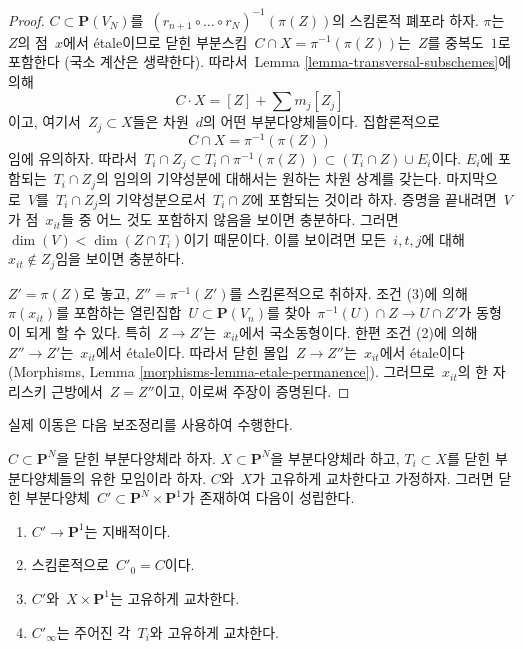 \begin{proof}
\medskip\noindent
$C \subset \mathbf{P}(V_N)$를\ 
$(r_{n + 1} \circ \ldots \circ r_N)^{-1}(\pi(Z))$의 스킴론적 폐포라
하자. $\pi$는\  $Z$의 점\  $x$에서 \'etale이므로 닫힌 부분스킴\ 
$C \cap X = \pi^{-1}(\pi(Z))$는\  $Z$를 중복도\  $1$로 포함한다
(국소 계산은 생략한다). 따라서\  Lemma
\ref{lemma-transversal-subschemes}에 의해
$$
C \cdot X = [Z] + \sum m_j[Z_j]
$$
이고, 여기서\  $Z_j \subset X$들은 차원\  $d$의 어떤 부분다양체들이다.
집합론적으로
$$
C \cap X = \pi^{-1}(\pi(Z))
$$
임에 유의하자. 따라서\ 
$T_i \cap Z_j \subset T_i \cap \pi^{-1}(\pi(Z)) \subset (T_i \cap Z) \cup E_i$이다.
$E_i$에 포함되는\  $T_i \cap Z_j$의 임의의 기약성분에 대해서는
원하는 차원 상계를 갖는다. 마지막으로\  $V$를\  $T_i \cap Z_j$의
기약성분으로서\  $T_i \cap Z$에 포함되는 것이라 하자. 증명을 끝내려면\ 
$V$가 점\  $x_{it}$들 중 어느 것도 포함하지 않음을 보이면 충분하다.
그러면\  $\dim(V) < \dim(Z \cap T_i)$이기 때문이다.
이를 보이려면 모든\  $i, t, j$에 대해\  $x_{it} \not \in Z_j$임을 보이면
충분하다.

\medskip\noindent
$Z' = \pi(Z)$로 놓고, $Z'' = \pi^{-1}(Z')$를 스킴론적으로 취하자.
조건 (3)에 의해\  $\pi(x_{it})$를 포함하는 열린집합\ 
$U \subset \mathbf{P}(V_n)$를 찾아\ 
$\pi^{-1}(U) \cap Z \to U \cap Z'$가 동형이 되게 할 수 있다.
특히\  $Z \to Z'$는\  $x_{it}$에서 국소동형이다. 한편 조건 (2)에 의해\ 
$Z'' \to Z'$는\  $x_{it}$에서 \'etale이다. 따라서 닫힌 몰입\ 
$Z \to Z''$는\  $x_{it}$에서 \'etale이다
(Morphisms, Lemma \ref{morphisms-lemma-etale-permanence}).
그러므로\  $x_{it}$의 한 자리스키 근방에서\  $Z = Z''$이고, 이로써
주장이 증명된다.
\end{proof}

\noindent
실제 이동은 다음 보조정리를 사용하여 수행한다.

\begin{lemma}
\label{lemma-move}
$C \subset \mathbf{P}^N$을 닫힌 부분다양체라 하자.
$X \subset \mathbf{P}^N$을 부분다양체라 하고, $T_i \subset X$를
닫힌 부분다양체들의 유한 모임이라 하자.
$C$와\  $X$가 고유하게 교차한다고 가정하자.
그러면 닫힌 부분다양체\  $C' \subset \mathbf{P}^N \times \mathbf{P}^1$가
존재하여 다음이 성립한다.
\begin{enumerate}
\item $C' \to \mathbf{P}^1$는 지배적이다.
\item 스킴론적으로\  $C'_0 = C$이다.
\item $C'$와\  $X \times \mathbf{P}^1$는 고유하게 교차한다.
\item $C'_\infty$는 주어진 각\  $T_i$와 고유하게 교차한다.
\end{enumerate}
\end{lemma}

